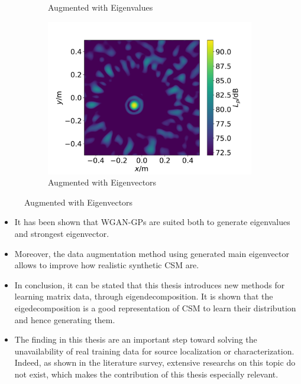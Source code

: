 \documentclass[12pt,pdftex,16x10]{elpres} %
\begin{document}
\begin{psli}
\begin{figure}
\begin{subfigure}[b]{0.5\linewidth}
      \caption{Augmented with Eigenvalues} 
    \end{subfigure}%
    \begin{subfigure}[b]{0.5\linewidth}
      \centering
      \includegraphics[width=0.75\linewidth]{figs/data_augmentation_evecs_augmented_csm.pdf} 
      \caption{Augmented with Eigenvectors}  
    \end{subfigure} 
  \end{figure}
\end{psli}

\begin{psli}[Conclusion]
  \begin{itemize}
    \item It has been shown that WGAN-GPs are suited both to generate eigenvalues and strongest eigenvector. 
    \item Moreover, the data augmentation method using generated main eigenvector allows to improve how realistic synthetic CSM are.
    \item In conclusion, it can be stated that this thesis introduces new methods for learning matrix data, through eigendecomposition. It is shown that the eigedecomposition is a good representation of CSM to learn their distribution and hence generating them. 
    \item The finding in this thesis are an important step toward solving the unavailability of real training data for source localization or characterization. Indeed, as shown in the literature survey, extensive researchs on this topic do not exist, which makes the contribution of this thesis especially relevant. 
  \end{itemize}
\end{psli}
\end{document}
